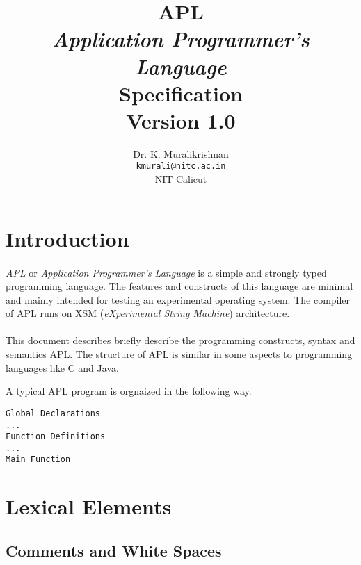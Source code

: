 \documentclass[11pt]{article}
\title{APL \\ \textit{Application Programmer's Language} \\ Specification \\ Version 1.0}
\author{Dr. K. Muralikrishnan  \\ \texttt{kmurali@nitc.ac.in} \\ {NIT Calicut} }
\begin{document}
 \newcommand{\kw}[1]{\texttt{#1}}

\maketitle

\pagebreak
\thispagestyle{plain}

\tableofcontents
\pagebreak


\section{Introduction}
\paragraph{}
\textit{APL} or \textit{Application Programmer's Language} is a simple and strongly typed programming language. The features and constructs of this language are minimal and mainly intended for testing an experimental operating system. The compiler of APL runs on XSM (\textit{eXperimental String Machine}) architecture.
\paragraph{}
This document describes briefly describe the programming constructs, syntax and semantics APL. The structure of APL is similar in some aspects to programming languages like C and Java. 

A typical APL program is orgnaized in the following way. 

\begin{verbatim}
Global Declarations
...
Function Definitions
...
Main Function
\end{verbatim}


\section{Lexical Elements}




\subsection{Comments and White Spaces}
\end{document}
